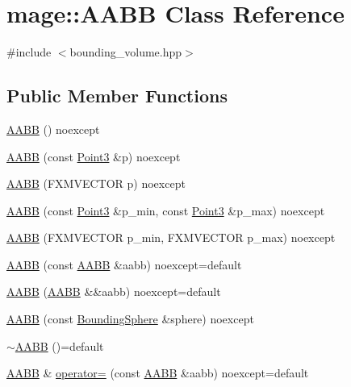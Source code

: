 \hypertarget{classmage_1_1_a_a_b_b}{}\section{mage\+:\+:A\+A\+BB Class Reference}
\label{classmage_1_1_a_a_b_b}


{\ttfamily \#include $<$bounding\+\_\+volume.\+hpp$>$}

\subsection*{Public Member Functions}
\begin{DoxyCompactItemize}
\item 
\mbox{\hyperlink{classmage_1_1_a_a_b_b_a4bf8c44135580cda2ab0c78da14c634e}{A\+A\+BB}} () noexcept
\item 
\mbox{\hyperlink{classmage_1_1_a_a_b_b_a97a4a755cb0b9c017fd5a311576a5c00}{A\+A\+BB}} (const \mbox{\hyperlink{structmage_1_1_point3}{Point3}} \&p) noexcept
\item 
\mbox{\hyperlink{classmage_1_1_a_a_b_b_a1876b5d2aaaef6409983395d7d5a2c04}{A\+A\+BB}} (F\+X\+M\+V\+E\+C\+T\+OR p) noexcept
\item 
\mbox{\hyperlink{classmage_1_1_a_a_b_b_a3d62727af89f01bbe4026da9093dc682}{A\+A\+BB}} (const \mbox{\hyperlink{structmage_1_1_point3}{Point3}} \&p\+\_\+min, const \mbox{\hyperlink{structmage_1_1_point3}{Point3}} \&p\+\_\+max) noexcept
\item 
\mbox{\hyperlink{classmage_1_1_a_a_b_b_a1b3e825922055027b53151c8eeb419ad}{A\+A\+BB}} (F\+X\+M\+V\+E\+C\+T\+OR p\+\_\+min, F\+X\+M\+V\+E\+C\+T\+OR p\+\_\+max) noexcept
\item 
\mbox{\hyperlink{classmage_1_1_a_a_b_b_abfd1c0d221df7aacc29b06afcd609994}{A\+A\+BB}} (const \mbox{\hyperlink{classmage_1_1_a_a_b_b}{A\+A\+BB}} \&aabb) noexcept=default
\item 
\mbox{\hyperlink{classmage_1_1_a_a_b_b_ad679d44369d5300de286e1fef947df1f}{A\+A\+BB}} (\mbox{\hyperlink{classmage_1_1_a_a_b_b}{A\+A\+BB}} \&\&aabb) noexcept=default
\item 
\mbox{\hyperlink{classmage_1_1_a_a_b_b_a16194c87d55c8461402682c3ff5db730}{A\+A\+BB}} (const \mbox{\hyperlink{classmage_1_1_bounding_sphere}{Bounding\+Sphere}} \&sphere) noexcept
\item 
\mbox{\hyperlink{classmage_1_1_a_a_b_b_a0fa31372f7488cb30b886c77bd676f17}{$\sim$\+A\+A\+BB}} ()=default
\item 
\mbox{\hyperlink{classmage_1_1_a_a_b_b}{A\+A\+BB}} \& \mbox{\hyperlink{classmage_1_1_a_a_b_b_a11ba6858dfeaf17cc3e297385c925a8b}{operator=}} (const \mbox{\hyperlink{classmage_1_1_a_a_b_b}{A\+A\+BB}} \&aabb) noexcept=default

\end{DoxyCompactItemize}
